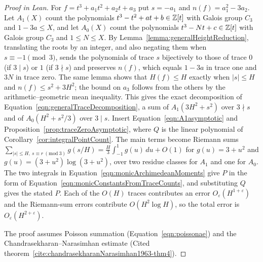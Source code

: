 \begin{proof}[Proof in Lean]

\leanok


For $f=t^3+a_1t^2+a_2t+a_3$ put $s=-a_1$ and $n(f)=a_1^2-3a_2$. Let $A_1(X)$ count the polynomials $t^3-t^2+at+b\in\mathbb{Z}[t]$ with Galois group $C_3$ and $1-3a\leq X$, and let $A_0(X)$ count the polynomials $t^3-Nt+c\in\mathbb{Z}[t]$ with Galois group $C_3$ and $1\leq N\leq X$. By Lemma~\ref{lemma:generalHeightReduction}, translating the roots by an integer, and also negating them when $s\equiv-1\pmod3$, sends the polynomials of trace $s$ bijectively to those of trace $0$ (if $3\mid s$) or $1$ (if $3\nmid s$) and preserves $n(f)$, which equals $1-3a$ in trace one and $3N$ in trace zero. The same lemma shows that $H(f)\leq H$ exactly when $|s|\leq H$ and $n(f)\leq s^2+3H^2$; the bound on $a_3$ follows from the others by the arithmetic--geometric mean inequality. This gives the exact decomposition of Equation~\ref{eqn:generalTraceDecomposition}, a sum of $A_1(3H^2+s^2)$ over $3\nmid s$ and of $A_0(H^2+s^2/3)$ over $3\mid s$. Insert Equation~\ref{eqn:A1asymptotic} and Proposition~\ref{prop:traceZeroAsymptotic}, where $Q$ is the linear polynomial of Corollary~\ref{cor:integralPointCount}. The main terms become Riemann sums $\sum_{|s|\leq H,\ s\equiv r\ (\mathrm{mod}\ 3)}g(s/H)=\frac H3\int_{-1}^1g(u)\,du+O(1)$ for $g(u)=3+u^2$ and $g(u)=(3+u^2)\log(3+u^2)$, over two residue classes for $A_1$ and one for $A_0$. The two integrals in Equation~\ref{eqn:monicArchimedeanMoments} give $P$ in the form of Equation~\ref{eqn:monicConstantsFromTraceCounts}, and substituting $Q$ gives the stated $P$. Each of the $O(H)$ traces contributes an error $O_\varepsilon(H^{1+\varepsilon})$ and the Riemann-sum errors contribute $O(H^2\log H)$, so the total error is $O_\varepsilon(H^{2+\varepsilon})$.

The proof assumes Poisson summation (Equation~\ref{eqn:poissonae}) and the Chandrasekharan--Narasimhan estimate (Cited theorem~\ref{cite:chandrasekharanNarasimhan1963-thm4}).

\end{proof}

